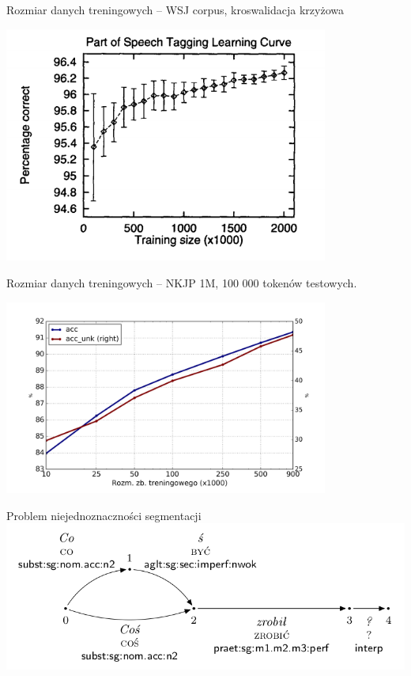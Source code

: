 \documentclass{beamer}
\begin{document}
\begin{frame}{Rozmiar danych treningowych}
   -- WSJ corpus, kroswalidacja krzyżowa
  \begin{center}
    \includegraphics[width=0.8\textwidth]{img/mbt_lcurve.png}
  \end{center}
\end{frame}

\begin{frame}{Rozmiar danych treningowych}
   -- NKJP 1M, 100 000 tokenów testowych.
  \begin{center}
    \includegraphics[width=0.8\textwidth]{img/concraft_lcurve.png}
  \end{center}
\end{frame}

\begin{frame}{Problem niejednoznaczności segmentacji}
  \\
  \includegraphics[width=\textwidth]{img/segm_amb1.png}
\end{frame}
\end{document}
